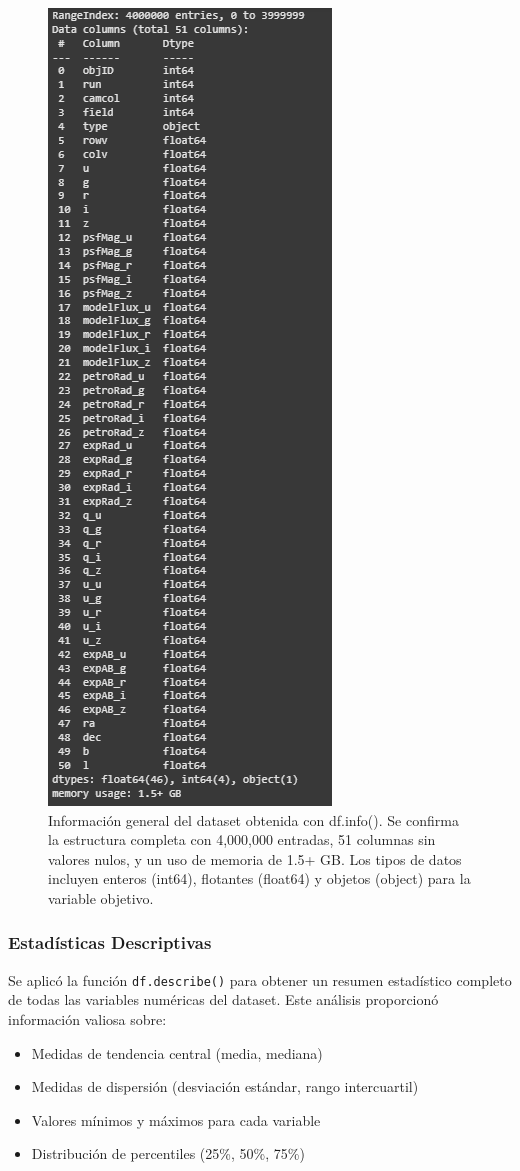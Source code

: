 \documentclass{article}
\begin{document}
\begin{figure}[H]
    \centering
    \includegraphics[width=0.3\linewidth]{info_1.png}
    \caption{Información general del dataset obtenida con df.info(). Se confirma la estructura completa con 4,000,000 entradas, 51 columnas sin valores nulos, y un uso de memoria de 1.5+ GB. Los tipos de datos incluyen enteros (int64), flotantes (float64) y objetos (object) para la variable objetivo.}
    \label{fig:info_dataset}
\end{figure}

\subsubsection{Estadísticas Descriptivas}

Se aplicó la función \texttt{df.describe()} para obtener un resumen estadístico completo de todas las variables numéricas del dataset. Este análisis proporcionó información valiosa sobre:

\begin{itemize}
    \item Medidas de tendencia central (media, mediana)
    \item Medidas de dispersión (desviación estándar, rango intercuartil)
    \item Valores mínimos y máximos para cada variable
    \item Distribución de percentiles (25\%, 50\%, 75\%)
\end{itemize}
\end{document}
